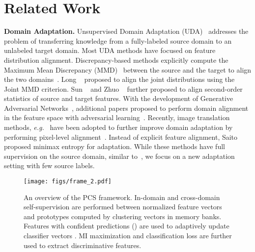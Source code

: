 \documentclass[final]{cvpr}
\begin{document}
\section{Related Work}
\noindent\textbf{Domain Adaptation.}
Unsupervised Domain Adaptation (UDA)~\cite{gopalan2011domain} addresses the problem of transferring knowledge from a fully-labeled source domain to an unlabeled target domain. Most UDA methods have focused on feature distribution alignment. Discrepancy-based methods explicitly compute the Maximum Mean Discrepancy (MMD)~\cite{gretton2012kernel} between the source and the target to align the two domains~\cite{long2015learning, tzeng2014deep, long2016unsupervised}. Long \etal~\cite{long2017deep} proposed to align the joint distributions using the Joint MMD criterion. Sun \etal~\cite{sun2017correlation} and Zhuo \etal~\cite{zhuo2017deep} further proposed to align second-order statistics of source and target features. With the development of Generative Adversarial Networks~\cite{goodfellow2014generative}, additional papers proposed to perform domain alignment in the feature space with adversarial learning~\cite{ganin2015unsupervised, tzeng2017adversarial, hoffman2018cycada, xie2018learning, long2018conditional, shen2017wasserstein}. Recently, image translation methods, \textit{e.g.}~\cite{zhu2017unpaired,liu2016coupled} have been adopted to further improve domain adaptation by performing pixel-level alignment~\cite{hoffman2018cycada, bousmalis2017unsupervised, russo2018source, murez2018image, yue2019domain, sankaranarayanan2018generate, shrivastava2017learning}. Instead of explicit feature alignment, Saito \etal~\cite{saito2019semi} proposed minimax entropy for adaptation. 
While these methods have full supervision on the source domain, similar to~\cite{kim2020cross}, we focus on a new adaptation setting with few source labels. 

\begin{figure*}[t]
 \centering
 \texttt{[image: figs/frame\_2.pdf]}
\caption{An overview of the PCS framework. In-domain and cross-domain self-supervision are performed between normalized feature vectors  and prototypes  computed by clustering vectors  in memory banks. Features with confident predictions () are used to adaptively update classifier vectors . MI maximization and classification loss are further used to extract discriminative features. }
 \label{fig:framework}
\end{figure*} 
\end{document}
